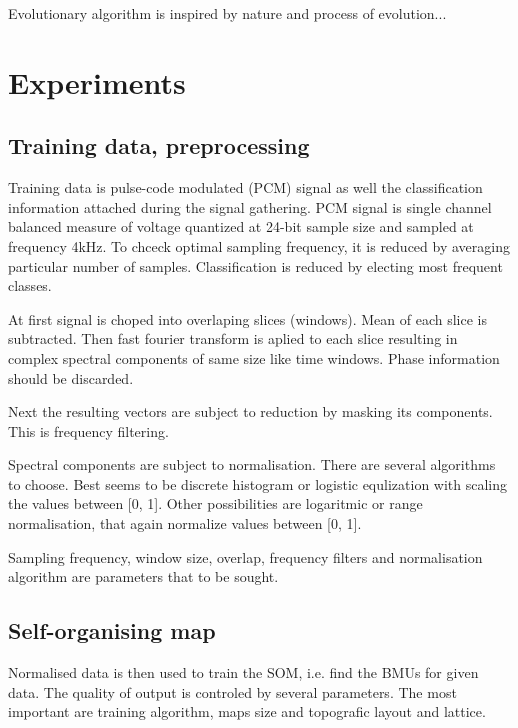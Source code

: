\documentclass[a4paper,journal]{IEEEtran}
\begin{document}
Evolutionary algorithm is inspired by nature and process of evolution...


\section{Experiments}
\subsection{Training data, preprocessing}
Training data is pulse-code modulated (PCM) signal as well the classification 
information attached during the signal gathering.
PCM signal is single channel balanced measure of voltage
quantized at 24-bit sample size
and sampled at frequency 4kHz. To chceck optimal sampling frequency,
it is reduced by averaging particular number of samples. Classification
is reduced by electing most frequent classes.

At first signal is choped into overlaping slices (windows).
Mean of each slice is subtracted.
Then fast fourier transform is aplied to each slice resulting in
complex spectral components of same size like time windows.
Phase information should be discarded.

Next the resulting vectors are subject to reduction by masking its components.
This is frequency filtering.

Spectral components are subject to normalisation.
There are several algorithms to choose. Best seems to be 
discrete histogram or logistic equlization with scaling the values between [0, 1].
Other possibilities are logaritmic or range normalisation, that again normalize
values between [0, 1].

Sampling frequency, window size, overlap, frequency filters and normalisation algorithm 
are parameters that to be sought.

\subsection{Self-organising map}
Normalised data is then used to train the SOM, i.e. find the BMUs for given data.
The quality of output is controled by several parameters. The most important are 
training algorithm, maps size and topografic layout and lattice.
\end{document}
